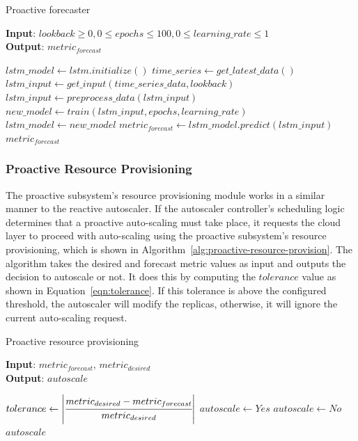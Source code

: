 \begin{algorithm}
    \caption{Proactive forecaster}
    \label{alg:proactive-forecast-alg}
    \textbf{Input}: $lookback \geq 0, 0 \leq epochs \leq 100, 0 \leq learning\_rate \leq 1$\\
    \textbf{Output}: $metric_{forecast}$
    \begin{algorithmic}
        \State $lstm\_model \gets lstm.initialize()$
        \State $time\_series \gets get\_latest\_data()$
        \State $lstm\_input \gets get\_input(time\_series\_data, lookback)$
        \State $lstm\_input \gets preprocess\_data(lstm\_input)$
        \State $new\_model \gets train(lstm\_input, epochs, learning\_rate)$
            \State $lstm\_model \gets new\_model$
        \EndIf
        \State $metric_{forecast} \gets lstm\_model.predict(lstm\_input)$
        \State \Return $metric_{forecast}$
    \end{algorithmic}
\end{algorithm}

\subsubsection{Proactive Resource Provisioning}

The proactive subsystem's resource provisioning module works in a similar manner to the reactive autoscaler. If the autoscaler controller's scheduling logic determines that a proactive auto-scaling must take place, it requests the cloud layer to proceed with auto-scaling using the proactive subsystem's resource provisioning, which is shown in Algorithm~\ref{alg:proactive-resource-provision}. The algorithm takes the desired and forecast metric values as input and outputs the decision to autoscale or not. It does this by computing the $tolerance$ value as shown in Equation~\ref{eqn:tolerance}. If this tolerance is above the configured threshold, the autoscaler will modify the replicas, otherwise, it will ignore the current auto-scaling request.\par

\begin{algorithm}
    \caption{Proactive resource provisioning}
    \label{alg:proactive-resource-provision}
    \textbf{Input}: $metric_{forecast},\, metric_{desired}$\\
    \textbf{Output}: $autoscale$
    \begin{algorithmic}
        \State $tolerance \gets \abs{ \cfrac{metric_{desired} - metric_{forecast}}{metric_{desired}} }$
            \State $autoscale \gets Yes$
        \Else
            \State $autoscale \gets No$
        \EndIf
        \State \Return $autoscale$
    \end{algorithmic}
\end{algorithm}

